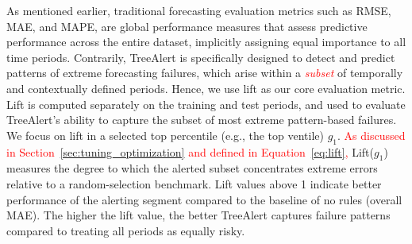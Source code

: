 \documentclass[12pt]{article}
\newcommand{\matt}[1]{\textcolor{red}{#1}}
\begin{document}
As mentioned earlier, traditional forecasting evaluation metrics such as RMSE, MAE, and MAPE, are global performance measures that assess predictive performance across the entire dataset, implicitly assigning equal importance to all time periods. Contrarily, TreeAlert is specifically designed to detect and predict patterns of extreme forecasting failures, which arise within a \matt{\emph{subset}} of temporally and contextually defined periods. Hence, we use lift as our core evaluation metric. Lift is computed separately on the training and test periods, and used to evaluate TreeAlert's ability to capture the subset of most extreme pattern-based failures. We focus on lift in a selected top percentile (e.g., the top ventile) $g_1$. \matt{As discussed in Section~\ref{sec:tuning_optimization} and defined in Equation~\eqref{eq:lift},} Lift($g_1$) measures the degree to which the alerted subset concentrates extreme errors relative to a random-selection benchmark. Lift values above 1 indicate better performance of the alerting segment compared to the baseline of no rules (overall MAE). The higher the lift value, the better TreeAlert captures failure patterns compared to treating all periods as equally risky. %


\end{document}
